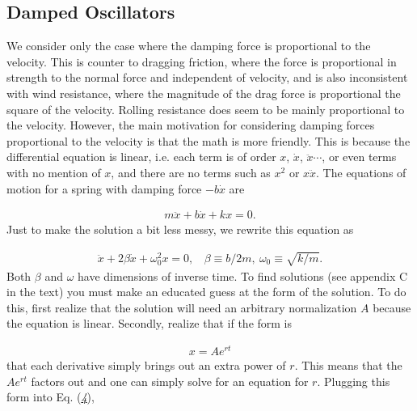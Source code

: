 \documentclass[letterpaper,10pt,english]{sphinxmanual}
\begin{document}
\subsection{Damped Oscillators}
\label{\detokenize{chapter4:damped-oscillators}}
We consider only the case where the damping force is proportional to
the velocity. This is counter to dragging friction, where the force is
proportional in strength to the normal force and independent of
velocity, and is also inconsistent with wind resistance, where the
magnitude of the drag force is proportional the square of the
velocity. Rolling resistance does seem to be mainly proportional to
the velocity. However, the main motivation for considering damping
forces proportional to the velocity is that the math is more
friendly. This is because the differential equation is linear,
i.e. each term is of order \(x\), \(\dot{x}\), \(\ddot{x}\cdots\), or even
terms with no mention of \(x\), and there are no terms such as \(x^2\) or
\(x\ddot{x}\). The equations of motion for a spring with damping force
\(-b\dot{x}\) are




\begin{equation*}
\begin{split}
\begin{equation}
m\ddot{x}+b\dot{x}+kx=0.
\label{_auto3} \tag{3}
\end{equation}
\end{split}
\end{equation*}
Just to make the solution a bit less messy, we rewrite this equation as




\begin{equation*}
\begin{split}
\begin{equation}
\label{eq:dampeddiffyq} \tag{4}
\ddot{x}+2\beta\dot{x}+\omega_0^2x=0,~~~~\beta\equiv b/2m,~\omega_0\equiv\sqrt{k/m}.
\end{equation}
\end{split}
\end{equation*}
Both \(\beta\) and \(\omega\) have dimensions of inverse time. To find solutions (see appendix C in the text) you must make an educated guess at the form of the solution. To do this, first realize that the solution will need an arbitrary normalization \(A\) because the equation is linear. Secondly, realize that if the form is




\begin{equation*}
\begin{split}
\begin{equation}
x=Ae^{rt}
\label{_auto4} \tag{5}
\end{equation}
\end{split}
\end{equation*}
that each derivative simply brings out an extra power of \(r\). This
means that the \(Ae^{rt}\) factors out and one can simply solve for an
equation for \(r\). Plugging this form into Eq. ({\hyperref[\detokenize{chapter4:eq:dampeddiffyq}]{\emph{4}}}),
\end{document}
